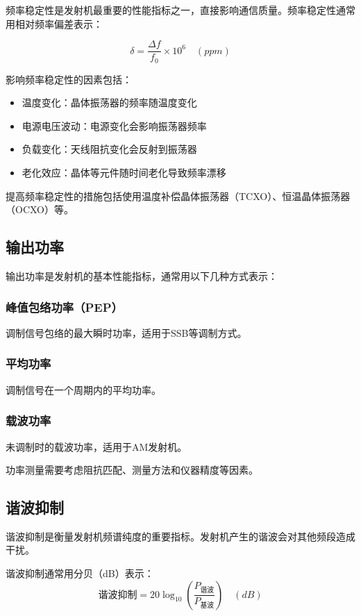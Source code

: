 \documentclass[12pt,UTF8]{ctexbook}
\begin{document}
频率稳定性是发射机最重要的性能指标之一，直接影响通信质量。频率稳定性通常用相对频率偏差表示：

\begin{equation}
\delta = \frac{\Delta f}{f_0} \times 10^6 \quad (ppm)
\end{equation}

影响频率稳定性的因素包括：
\begin{itemize}[leftmargin=3.5em]
    \item 温度变化：晶体振荡器的频率随温度变化
    \item 电源电压波动：电源变化会影响振荡器频率
    \item 负载变化：天线阻抗变化会反射到振荡器
    \item 老化效应：晶体等元件随时间老化导致频率漂移
\end{itemize}

提高频率稳定性的措施包括使用温度补偿晶体振荡器（TCXO）、恒温晶体振荡器（OCXO）等。

\subsection{输出功率}

输出功率是发射机的基本性能指标，通常用以下几种方式表示：

\subsubsection{峰值包络功率（PEP）}
调制信号包络的最大瞬时功率，适用于SSB等调制方式。

\subsubsection{平均功率}
调制信号在一个周期内的平均功率。

\subsubsection{载波功率}
未调制时的载波功率，适用于AM发射机。

功率测量需要考虑阻抗匹配、测量方法和仪器精度等因素。

\subsection{谐波抑制}

谐波抑制是衡量发射机频谱纯度的重要指标。发射机产生的谐波会对其他频段造成干扰。

谐波抑制通常用分贝（dB）表示：
\begin{equation}
谐波抑制 = 20\log_{10}\left(\frac{P_{谐波}}{P_{基波}}\right) \quad (dB)
\end{equation}
\end{document}
